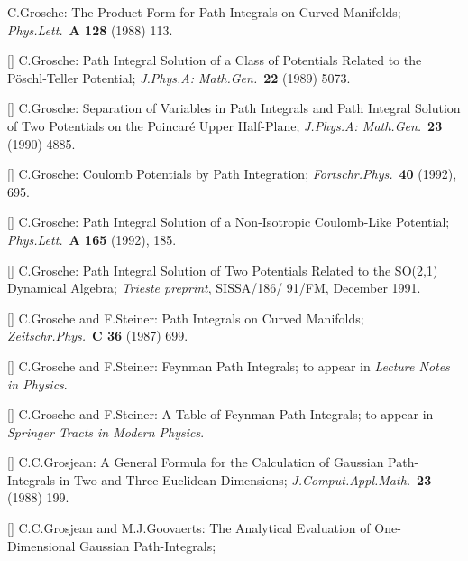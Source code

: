 C.Grosche:
The Product Form for Path Integrals on Curved Manifolds;
{\it Phys.Lett.}\ {\bf A 128} (1988) 113.
\item{[\GROe]}
C.Grosche:
Path Integral Solution of a Class of Potentials Related to the
P\"oschl-Teller Potential;
{\it J.Phys.A: Math.Gen.}\ {\bf 22} (1989) 5073.
\item{[\GROj]}
C.Grosche:
Separation of Variables in Path Integrals and Path Integral Solution
of Two Potentials on the Poincar\'e Upper Half-Plane;
{\it J.Phys.A: Math.Gen.}\ {\bf 23} (1990) 4885.
\item{[\GROm]}
C.Grosche:
Coulomb Potentials by Path Integration;
{\it Fort\-schr.Phys.}\ {\bf 40} (1992), 695.
\item{[\GROo]}
C.Grosche:
Path Integral Solution of a Non-Isotropic Coulomb-Like Potential;
{\it Phys.Lett.}\ {\bf A 165} (1992), 185.
\item{[\GROp]}
C.Grosche:
Path Integral Solution of Two Potentials Related to the SO(2,1)
Dynamical Algebra;
{\it Trieste preprint}, SISSA/186/ 91/FM, December 1991.
\item{[\GRSb]}
C.Grosche and F.Steiner:
Path Integrals on Curved Manifolds;
{\it Zeitschr.Phys.}\ {\bf C 36} (1987) 699.
\item{[\GRSf]}
C.Grosche and F.Steiner:
Feynman Path Integrals;
to appear in {\it Lecture Notes in Physics}.
\item{[\GRSg]}
C.Grosche and F.Steiner:
A Table of Feynman Path Integrals;
to appear in {\it Springer Tracts in Modern Physics}.
\item{[\GROS]}
C.C.Grosjean:
A General Formula for the Calculation of Gaussian Path-Integrals in
Two and Three Euclidean Dimensions;
{\it J.Comput.Appl.Math.}\ {\bf 23} (1988) 199.
\item{[\GROGOb]}
C.C.Grosjean and M.J.Goovaerts:
The Analytical Evaluation of One-Dimensional Gaussian Path-Integrals;
